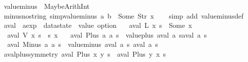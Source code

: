 \begin{isabellebody}
%
\isadelimproof
\isanewline
%
\endisadelimproof
\isanewline
{}\isamarkupfalse%
\ {\isachardoublequoteopen}value{\isacharunderscore}minus\ {\isacharequal}\ MaybeArithInt\ {\isacharparenleft}{\isacharminus}{\isacharparenright}{\isachardoublequoteclose}\isanewline
\isanewline
{}\isamarkupfalse%
\ minus{\isacharunderscore}no{\isacharunderscore}string\ {\isacharbrackleft}simp{\isacharbrackright}{\isacharcolon}{\isachardoublequoteopen}value{\isacharunderscore}minus\ a\ b\ {\isasymnoteq}\ Some\ {\isacharparenleft}Str\ x{\isacharparenright}{\isachardoublequoteclose}\isanewline
%
\isadelimproof
\ \ %
\endisadelimproof
%
\isatagproof
{}\isamarkupfalse%
\ {\isacharparenleft}simp\ add{\isacharcolon}\ value{\isacharunderscore}minus{\isacharunderscore}def{\isacharparenright}%
\endisatagproof
{\isafoldproof}%
%
\isadelimproof
\isanewline
%
\endisadelimproof
\isanewline
{}\isamarkupfalse%
\ aval\ {\isacharcolon}{\isacharcolon}\ {\isachardoublequoteopen}aexp\ {\isasymRightarrow}\ datastate\ {\isasymRightarrow}\ value\ option{\isachardoublequoteclose}\ \isanewline
\ \ {\isachardoublequoteopen}aval\ {\isacharparenleft}L\ x{\isacharparenright}\ s\ {\isacharequal}\ Some\ x{\isachardoublequoteclose}\ {\isacharbar}\isanewline
\ \ {\isachardoublequoteopen}aval\ {\isacharparenleft}V\ x{\isacharparenright}\ s\ {\isacharequal}\ s\ x{\isachardoublequoteclose}\ {\isacharbar}\isanewline
\ \ {\isachardoublequoteopen}aval\ {\isacharparenleft}Plus\ a\ a\ s\ {\isacharequal}\ value{\isacharunderscore}plus\ {\isacharparenleft}aval\ a\ s{\isacharparenright}{\isacharparenleft}aval\ a\ s{\isacharparenright}{\isachardoublequoteclose}\ {\isacharbar}\isanewline
\ \ {\isachardoublequoteopen}aval\ {\isacharparenleft}Minus\ a\ a\ s\ {\isacharequal}\ value{\isacharunderscore}minus\ {\isacharparenleft}aval\ a\ s{\isacharparenright}\ {\isacharparenleft}aval\ a\ s{\isacharparenright}{\isachardoublequoteclose}\isanewline
\isanewline
{}\isamarkupfalse%
\ aval{\isacharunderscore}plus{\isacharunderscore}symmetry{\isacharcolon}\ {\isachardoublequoteopen}aval\ {\isacharparenleft}Plus\ x\ y{\isacharparenright}\ s\ {\isacharequal}\ aval\ {\isacharparenleft}Plus\ y\ x{\isacharparenright}\ s{\isachardoublequoteclose}\isanewline
%
\isadelimproof
\ \ %
\endisadelimproof
%
\isatagproof

\end{isabellebody}
